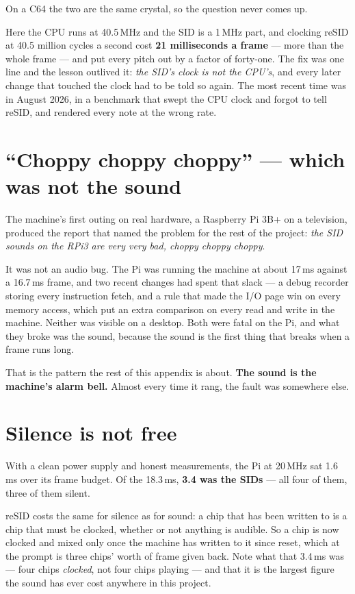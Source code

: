 On a C64 the two are the same crystal, so the question never comes up.

Here the CPU runs at 40.5\,MHz and the SID is a 1\,MHz part, and
clocking reSID at 40.5 million cycles a second cost \textbf{21
milliseconds a frame} --- more than the whole frame --- and put every
pitch out by a factor of forty-one. The fix was one line and the lesson
outlived it: \emph{the SID's clock is not the CPU's}, and every later
change that touched the clock had to be told so again. The most recent
time was in August 2026, in a benchmark that swept the CPU clock and
forgot to tell reSID, and rendered every note at the wrong rate.

\section{``Choppy choppy choppy'' --- which was not the sound}
The machine's first outing on real hardware, a Raspberry Pi 3B+ on a
television, produced the report that named the problem for the rest of
the project: \emph{the SID sounds on the RPi3 are very very bad, choppy
choppy choppy}.

It was not an audio bug. The Pi was running the machine at about
17\,ms against a 16.7\,ms frame, and two recent changes had spent that
slack --- a debug recorder storing every instruction fetch, and a rule
that made the I/O page win on every memory access, which put an extra
comparison on every read and write in the machine. Neither was visible
on a desktop. Both were fatal on the Pi, and what they broke was the
sound, because the sound is the first thing that breaks when a frame
runs long.

That is the pattern the rest of this appendix is about. \textbf{The
sound is the machine's alarm bell.} Almost every time it rang, the fault
was somewhere else.

\section{Silence is not free}
With a clean power supply and honest measurements, the Pi at 20\,MHz sat
1.6\,ms over its frame budget. Of the 18.3\,ms, \textbf{3.4 was the
SIDs} --- all four of them, three of them silent.

reSID costs the same for silence as for sound: a chip that has been
written to is a chip that must be clocked, whether or not anything is
audible. So a chip is now clocked and mixed only once the machine has
written to it since reset, which at the prompt is three chips' worth of
frame given back. Note what that 3.4\,ms was --- four chips
\emph{clocked}, not four chips playing --- and that it is the largest
figure the sound has ever cost anywhere in this project.

